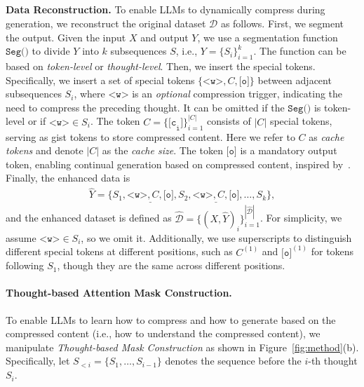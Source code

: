 \subsection{\ours}
\label{sec:method:method}

\textbf{Data Reconstruction.}
To enable LLMs to dynamically compress during generation, we reconstruct the original dataset $\mathcal{D}$ as follows.
First, we segment the output.
Given the input $X$ and output $Y$, we use a segmentation function $\texttt{Seg()}$ to divide $Y$ into $k$ subsequences $S$, i.e., $Y=\{S_i\}_{i=1}^{k}$.
The function can be based on \textit{token-level} or \textit{thought-level}.
Then, we insert the special tokens.
Specifically, we insert a set of special tokens $\{\texttt{<w>}, C, \texttt{[o]}\}$ between adjacent subsequences $S_i$, where $\texttt{<w>}$ is an \textit{optional} compression trigger, indicating the need to compress the preceding thought.
It can be omitted if the $\texttt{Seg()}$ is token-level or if $\texttt{<w>}\in S_i$.
The token $C=\{\texttt{[c}_\texttt{i}\texttt{]}\}_{i=1}^{|C|}$ consists of $|C|$ special tokens, serving as gist tokens to store compressed content. 
Here we refer to $C$ as \textit{cache tokens} and denote $|C|$ as the \textit{cache size}.
The token $\texttt{[o]}$ is a mandatory output token, enabling continual generation based on compressed content, inspired by~\citeauthor{emnlp24_onegen}.
Finally, the enhanced data is 
\begin{align*}
\hat{Y}=\{S_1, \underline{\texttt{<w>}, C, \texttt{[o]}}, S_2, \underline{\texttt{<w>}, C, \texttt{[o]}}, \dots, S_k\},
\end{align*}
and the enhanced dataset is defined as $\hat{\mathcal{D}}=\{(X,\hat{Y})_i\}_{i=1}^{|\hat{\mathcal{D}}|}$.
For simplicity, we assume $\texttt{<w>}\in S_i$, so we omit it. 
Additionally, we use superscripts to distinguish different special tokens at different positions, such as $C^{(1)}$ and $\texttt{[o]}^{(1)}$ for tokens following $S_1$, though they are the same across different positions.

\paragraph{Thought-based Attention Mask Construction.}
To enable LLMs to learn how to compress and how to generate based on the compressed content (i.e., how to understand the compressed content), we manipulate \textit{Thought-based Mask Construction} as shown in Figure~\ref{fig:method}(b).
Specifically, let $S_{<i}=\{S_1,\dots,S_{i-1}\}$ denotes the sequence before the $i$-th thought $S_i$.


